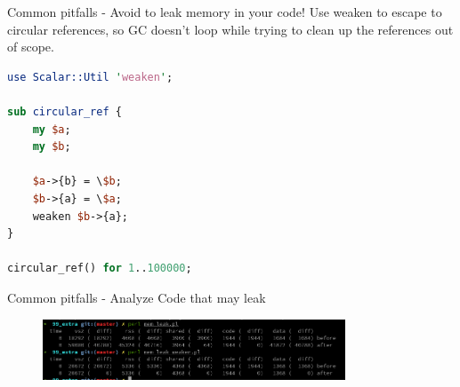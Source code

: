\documentclass[10pt]{beamer}
\begin{document}
\begin{frame}[fragile]{Common pitfalls - Avoid to leak memory in your code!}
Use weaken to escape to circular references, so GC doesn't loop while trying to clean up the references out of scope.


\begin{lstlisting}[language=perl]
use Scalar::Util 'weaken';

sub circular_ref {
	my $a;
	my $b;

	$a->{b} = \$b;
	$b->{a} = \$a;
	weaken $b->{a};
}

circular_ref() for 1..100000;
\end{lstlisting}

\end{frame}


\begin{frame}[fragile]{Common pitfalls - Analyze Code that may leak}


\begin{figure}
    \centering
    \includegraphics[width=9cm]{images/mem_leak.png}
\end{figure}
\end{frame}
\end{document}
